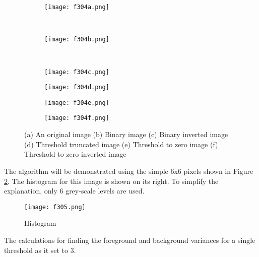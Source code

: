 \begin{figure}
	\centering
	\begin{subfigure}[b]{0.3\textwidth}
		\texttt{[image: f304a.png]}
		\caption{}
	\end{subfigure}%
	~ %
	\begin{subfigure}[b]{0.3\textwidth}
		\texttt{[image: f304b.png]}
		\caption{}
	\end{subfigure}
	~ %
	\begin{subfigure}[b]{0.3\textwidth}
		\texttt{[image: f304c.png]}
		\caption{}
	\end{subfigure}
	\begin{subfigure}[b]{0.3\textwidth}
		\texttt{[image: f304d.png]}
		\caption{}
	\end{subfigure}
	\begin{subfigure}[b]{0.3\textwidth}
		\texttt{[image: f304e.png]}
		\caption{}
	\end{subfigure}
	\begin{subfigure}[b]{0.3\textwidth}
		\texttt{[image: f304f.png]}
		\caption{}
	\end{subfigure}
	\caption{(a) An original image (b) Binary image (c) Binary inverted image (d) Threshold truncated image (e) Threshold to zero image (f) Threshold to zero inverted image}\label{fig:f304}
\end{figure}
The algorithm will be demonstrated using the simple 6x6 pixels shown in Figure \ref{fig:f305}. The histogram for this image is shown on its right. To simplify the explanation, only 6 grey-scale levels are used.
\begin{figure}[t]
	\centering
	\texttt{[image: f305.png]}
	\caption{Histogram}
	\label{fig:f305}
\end{figure}

The calculations for finding the foreground and background variances for a single threshold as it set to 3. 

